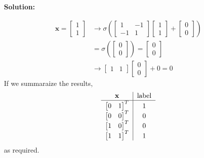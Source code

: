 \documentclass{article}
\newenvironment{solution}
  {\par\noindent\textbf{Solution:}\par}
  {\par}
\begin{document}
\begin{solution}
\[ 
\begin{aligned}
\mathbf{x}= \begin{bmatrix}
1 \\
1
\end{bmatrix} &\to \sigma(\begin{bmatrix}
1 & -1  \\
-1 & 1
\end{bmatrix}\begin{bmatrix}
1 \\
1
\end{bmatrix} + \begin{bmatrix}
0 \\
0
\end{bmatrix}) \\
&= \sigma(\begin{bmatrix}
0  \\
0
\end{bmatrix}) = \begin{bmatrix}
0 \\
0
\end{bmatrix} \\ 
&\to \begin{bmatrix}
1 & 1
\end{bmatrix}\begin{bmatrix}
0 \\
0
\end{bmatrix}+0 = 0
\end{aligned}
\]
If we summaraize the results,
\[
\begin{tabular}{c|c}
  \textbf{x} & \text{label} \\
  \hline
  $\begin{bmatrix}
    0 & 1 
  \end{bmatrix}^T$ & 1 \\
  $\begin{bmatrix}
    0 & 0 
  \end{bmatrix}^T$ & 0 \\
   $\begin{bmatrix}
    1 & 0 
  \end{bmatrix}^T$ & 0 \\
  $\begin{bmatrix}
    1 & 1 
  \end{bmatrix}^T$ & 1 \\
  
\end{tabular}
\]
as required.
\end{solution}
\end{document}
